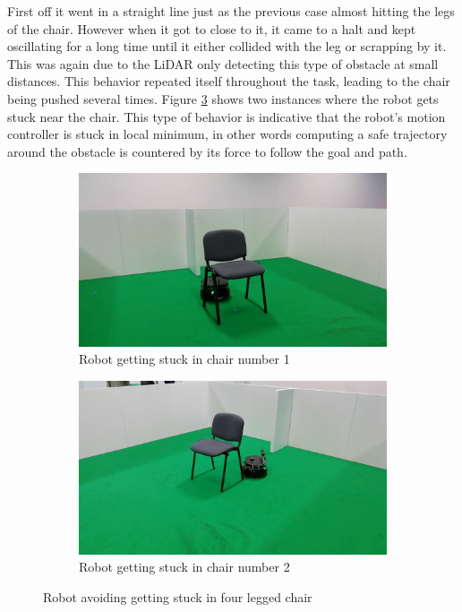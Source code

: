 First off it went in a straight line just as the previous case almost hitting  the legs of the chair. However when it got to close to it, it came to a halt and kept oscillating for a long time until it either collided with the leg or scrapping by it. This was again due to the \ac{LiDAR} only detecting this type of obstacle at small distances. This behavior repeated itself throughout the task, leading to the chair being pushed several times. Figure \ref{fig:nchairLF} shows two instances where the robot gets stuck near the chair. This type of behavior is indicative that the robot's motion controller is stuck in local minimum, in other words computing a safe trajectory around the obstacle is countered by its force to follow the goal and path.
\begin{figure}[h!]
  \centering
  \begin{subfigure}[b]{0.49\linewidth}
    \includegraphics[width=\linewidth]{imgs/chapter5/nchairLF.png}
     \caption{Robot getting stuck in chair number 1}
     \label{fig::nchairLF1}
  \end{subfigure}
  \begin{subfigure}[b]{0.49\linewidth}
    \includegraphics[width=\linewidth]{imgs/chapter5/nchairLF2.png}
    \caption{Robot getting stuck in chair number 2}
    \label{fig::nchairLF2}
  \end{subfigure}
  \caption{Robot avoiding getting stuck in four legged chair}
  \label{fig:nchairLF}
\end{figure}

